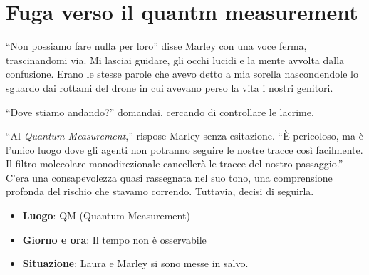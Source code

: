 \section{Fuga verso il quantm measurement}
\begin{center}
\begin{minipage}{0.7\textwidth}
    \centering
\end{minipage}
\end{center}

\enquote{Non possiamo fare nulla per loro} disse Marley con una voce ferma, trascinandomi via. Mi lasciai guidare, gli occhi lucidi e la mente avvolta dalla confusione. Erano le stesse parole che avevo detto a mia sorella nascondendole lo sguardo dai rottami del drone in cui avevano perso la vita i nostri genitori.

\enquote{Dove stiamo andando?} domandai, cercando di controllare le lacrime.

\enquote{Al \textit{Quantum Measurement},} rispose Marley senza esitazione. \enquote{È pericoloso, ma è l'unico luogo dove gli agenti non potranno seguire le nostre tracce così facilmente. Il filtro molecolare monodirezionale cancellerà le tracce del nostro passaggio.} C'era una consapevolezza quasi rassegnata nel suo tono, una comprensione profonda del rischio che stavamo correndo. Tuttavia, decisi di seguirla.
\begin{tcolorbox}[colback=gray!5,colframe=gray!80,title=\textbf{Scheda Informativa}]
\begin{itemize}
    \item \textbf{Luogo}: QM (Quantum Measurement)
    \item \textbf{Giorno e ora}: Il tempo non è osservabile
    \item \textbf{Situazione}: Laura e Marley si sono messe in salvo.
\end{itemize}
\end{tcolorbox}

